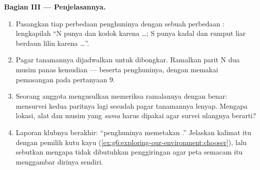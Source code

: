 \begin{problem}
\medskip\noindent\textbf{Bagian III --- Penjelasannya.}
\begin{enumerate}[resume]
  \item Pasangkan tiap perbedaan penghuninya dengan sebuah perbedaan
        : lengkapilah ``N punya  dan kodok karena
        \dots; S punya kadal dan rumput liar berdaun lilin karena
        \dots''.
  \item Pagar tanamannya dijadwalkan untuk dibongkar. Ramalkan 
        parit N dua musim panas kemudian --- beserta penghuninya,
        dengan memakai pemasangan pada pertanyaan 9.
  \item Seorang anggota mengusulkan memeriksa ramalannya dengan benar:
        mensurvei kedua paritnya lagi sesudah pagar tanamannya lenyap.
        Mengapa lokasi, alat dan musim yang \emph{sama} harus dipakai
        agar survei ulangnya berarti?
  \item Laporan klubnya berakhir: ``penghuninya memetakan .''
        Jelaskan kalimat itu dengan pemilih kutu kayu
        (\cref{ex:g6:exploring-our-environment:chooser}), lalu
        sebutkan mengapa tidak dibutuhkan penggiringan agar peta
        semacam itu menggambar dirinya sendiri.
\end{enumerate}
\end{problem}
